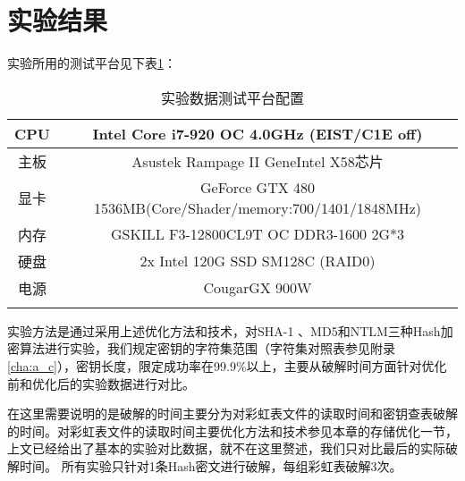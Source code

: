 \section{实验结果}
实验所用的测试平台见下表\ref{tab:5.3}：
\begin{longtable}{@{\extracolsep{\fill}}cc}
\caption{实验数据测试平台配置}\\\toprule[1pt]
\multicolumn{1}{c}{CPU} & \multicolumn{1}{c}{Intel Core i7-920 OC 4.0GHz (EIST/C1E off)} \\\hline
主板 & Asustek Rampage II GeneIntel X58芯片 \\\hline
显卡 & GeForce GTX 480 1536MB(Core/Shader/memory:700/1401/1848MHz) \\\hline
内存 & GSKILL F3-12800CL9T OC DDR3-1600 2G*3 \\\hline
硬盘 & 2x Intel 120G SSD SM128C (RAID0) \\\hline
电源 &  CougarGX 900W  \\
\bottomrule[1pt]
\label{tab:5.3}
\end{longtable}
实验方法是通过采用上述优化方法和技术，对SHA-1 、MD5和NTLM三种Hash加密算法进行实验，我们规定密钥的字符集范围（字符集对照表参见附录\ref{cha:a_c}），密钥长度，限定成功率在99.9\%以上，主要从破解时间方面针对优化前和优化后的实验数据进行对比。

在这里需要说明的是破解的时间主要分为对彩虹表文件的读取时间和密钥查表破解的时间。对彩虹表文件的读取时间主要优化方法和技术参见本章的存储优化一节，上文已经给出了基本的实验对比数据，就不在这里赘述，我们只对比最后的实际破解时间。
所有实验只针对1条Hash密文进行破解，每组彩虹表破解3次。

